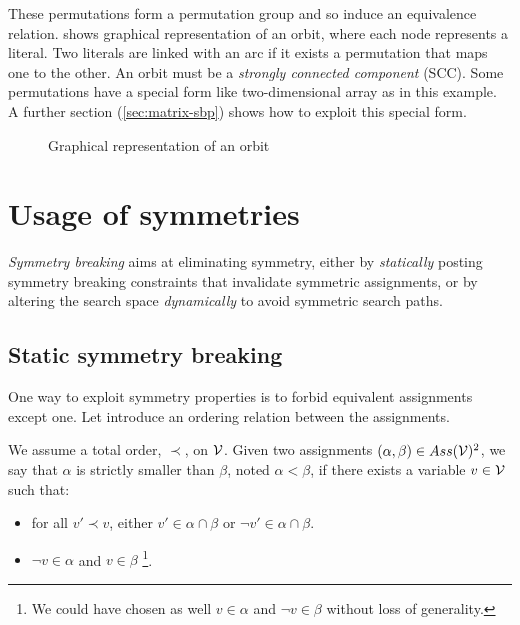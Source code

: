 These permutations form a permutation group and so induce an equivalence relation.
 shows graphical representation of an orbit, where each node represents a literal. Two literals are linked with an arc if it exists a permutation that maps one to the other. 
An orbit must be a \emph{strongly connected component} (SCC).  
Some permutations have a special form like two-dimensional
array as in this example.
 A further section (\ref{sec:matrix-sbp}) shows how to exploit this special form.
\begin{figure}[!htbp]
 
 \caption{Graphical representation of an orbit}
 \label{fig:orbit}
\end{figure}

\section{Usage of symmetries}
\emph{Symmetry breaking} aims at eliminating symmetry, either
by \emph{statically} posting symmetry breaking constraints that invalidate symmetric
assignments, or by altering the search space \emph{dynamically} to avoid symmetric search paths.

\subsection{Static symmetry breaking}
One way to exploit symmetry properties is to forbid equivalent assignments except one.
Let introduce an ordering relation between the assignments.
\begin{definition}
 \label{def:assignment_ordering}
 We assume a total order, $\prec$, on $\mathcal{V}$.  Given two assignments $(\alpha,\beta) \in Ass(\mathcal{V})^2 $, 
 we say that $\alpha$ is strictly smaller than $\beta$, noted $\alpha < \beta$, if there exists a variable $v \in \mathcal{V}$
 such that:
 \begin{itemize}
  \item for all $v' \prec v$, either $v' \in \alpha \cap \beta$ or $\neg v' \in \alpha \cap
  \beta$.
  \item $\neg v \in \alpha$ and $v \in \beta$ \footnote{We could have chosen as well 
   $v \in \alpha$ and $\neg v \in \beta$ without loss of generality.}.
 \end{itemize}
\end{definition}

